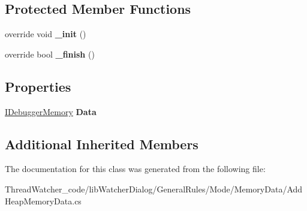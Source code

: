 \subsection*{Protected Member Functions}
\begin{DoxyCompactItemize}
\item 
\hypertarget{classlib_watcher_dialog_1_1_general_rules_1_1_mode_1_1_memory_data_1_1_add_heap_memory_data_afe3094e933ca82c098cd35cf24b77703}{override void {\bfseries \+\_\+init} ()}\label{classlib_watcher_dialog_1_1_general_rules_1_1_mode_1_1_memory_data_1_1_add_heap_memory_data_afe3094e933ca82c098cd35cf24b77703}

\item 
\hypertarget{classlib_watcher_dialog_1_1_general_rules_1_1_mode_1_1_memory_data_1_1_add_heap_memory_data_a563d712587b8691cc8b5b92d7c1e9b64}{override bool {\bfseries \+\_\+finish} ()}\label{classlib_watcher_dialog_1_1_general_rules_1_1_mode_1_1_memory_data_1_1_add_heap_memory_data_a563d712587b8691cc8b5b92d7c1e9b64}

\end{DoxyCompactItemize}
\subsection*{Properties}
\begin{DoxyCompactItemize}
\item 
\hypertarget{classlib_watcher_dialog_1_1_general_rules_1_1_mode_1_1_memory_data_1_1_add_heap_memory_data_ac231ca9e7280fa4ec3ef4ddc982c8f3a}{\hyperlink{interfacelib_utilities_1_1_i_debugger_memory}{I\+Debugger\+Memory} {\bfseries Data}}\label{classlib_watcher_dialog_1_1_general_rules_1_1_mode_1_1_memory_data_1_1_add_heap_memory_data_ac231ca9e7280fa4ec3ef4ddc982c8f3a}

\end{DoxyCompactItemize}
\subsection*{Additional Inherited Members}


The documentation for this class was generated from the following file\+:\begin{DoxyCompactItemize}
\item 
Thread\+Watcher\+\_\+code/lib\+Watcher\+Dialog/\+General\+Rules/\+Mode/\+Memory\+Data/Add\+Heap\+Memory\+Data.\+cs\end{DoxyCompactItemize}
